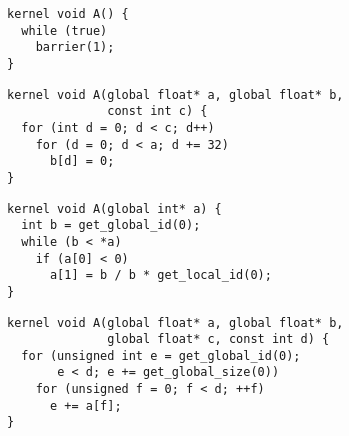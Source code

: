 \newsavebox{\IntelPostDominanceFrontier}
\begin{lrbox}{\IntelPostDominanceFrontier}
  \begin{minipage}{\textwidth}
    \begin{verbatim}
kernel void A() {
  while (true)
    barrier(1);
}
    \end{verbatim}
  \end{minipage}
\end{lrbox}
%
%

\newsavebox{\SimplifyTheCFGPass}
\begin{lrbox}{\SimplifyTheCFGPass}
  \begin{minipage}{\textwidth}
    \begin{verbatim}
kernel void A(global float* a, global float* b,
              const int c) {
  for (int d = 0; d < c; d++)
    for (d = 0; d < a; d += 32)
      b[d] = 0;
}
    \end{verbatim}
  \end{minipage}
\end{lrbox}

\newsavebox{\IntelPredicator}
\begin{lrbox}{\IntelPredicator}
  \begin{minipage}{\textwidth}
    \begin{verbatim}
kernel void A(global int* a) {
  int b = get_global_id(0);
  while (b < *a)
    if (a[0] < 0)
      a[1] = b / b * get_local_id(0);
}
    \end{verbatim}
  \end{minipage}
\end{lrbox}

\newsavebox{\IntelCombineRedundant}
\begin{lrbox}{\IntelCombineRedundant}
  \begin{minipage}{\textwidth}
    \begin{verbatim}
kernel void A(global float* a, global float* b,
              global float* c, const int d) {
  for (unsigned int e = get_global_id(0);
       e < d; e += get_global_size(0))
    for (unsigned f = 0; f < d; ++f)
      e += a[f];
}
    \end{verbatim}
  \end{minipage}
\end{lrbox}

